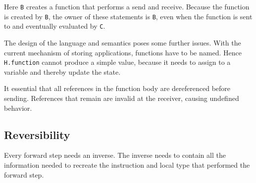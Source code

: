 \documentclass[runningheads]{llncs}
\begin{document}
Here \texttt{B} creates a function that performs a send and receive.
Because the function is created by \texttt{B}, the owner of these
statements is \texttt{B}, even when the function is sent to and
eventually evaluated by \texttt{C}.

The design of the language and semantics poses some further issues. With
the current mechanism of storing applications, functions have to be
named. Hence \texttt{H.function} cannot produce a simple value, because
it needs to assign to a variable and thereby update the state.

It essential that all references in the function body are dereferenced
before sending. References that remain are invalid at the receiver,
causing undefined behavior.

\subsection{Reversibility}\label{reversibility}

Every forward step needs an inverse. The inverse needs to contain all
the information needed to recreate the instruction and local type that
performed the forward step.
\end{document}
